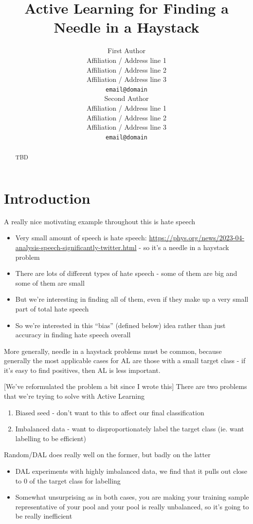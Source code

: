 \documentclass[11pt]{article}
\title{Active Learning for Finding a Needle in a Haystack}
\author{First Author \\
  Affiliation / Address line 1 \\
  Affiliation / Address line 2 \\
  Affiliation / Address line 3 \\
  \texttt{email@domain} \\\And
  Second Author \\
  Affiliation / Address line 1 \\
  Affiliation / Address line 2 \\
  Affiliation / Address line 3 \\
  \texttt{email@domain} \\}
\begin{document}
\maketitle
\begin{abstract}
TBD
\end{abstract}

\section{Introduction}

A really nice motivating example throughout this is hate speech 
\begin{itemize}
    \item Very small amount of speech is hate speech: \url{https://phys.org/news/2023-04-analysis-speech-significantly-twitter.html} - so it's a needle in a haystack problem
    \item There are lots of different types of hate speech - some of them are big and some of them are small 
    \item But we're interesting in finding all of them, even if they make up a very small part of total hate speech
    \item So we're interested in this ``bias'' (defined below) idea rather than just accuracy in finding hate speech overall 
\end{itemize}

More generally, needle in a haystack problems must be common, because generally the most applicable cases for AL are those with a small target class - if it’s easy to find positives, then AL is less important. 

[We've reformulated the problem a bit since I wrote this] There are two problems that we're trying to solve with Active Learning 

\begin{enumerate}
\item Biased seed - don’t want to this to affect our final classification 
\item Imbalanced data - want to disproportionately label the target class (ie. want labelling to be efficient) 
\end{enumerate}

Random/DAL does really well on the former, but badly on the latter

\begin{itemize}
\item DAL experiments with highly imbalanced data, we find that it pulls out close to 0 of the target class for labelling 
\item Somewhat unsurprising as in both cases, you are making your training sample representative of your pool and your pool is really unbalanced, so it’s going to be really inefficient
\end{itemize}
\end{document}

